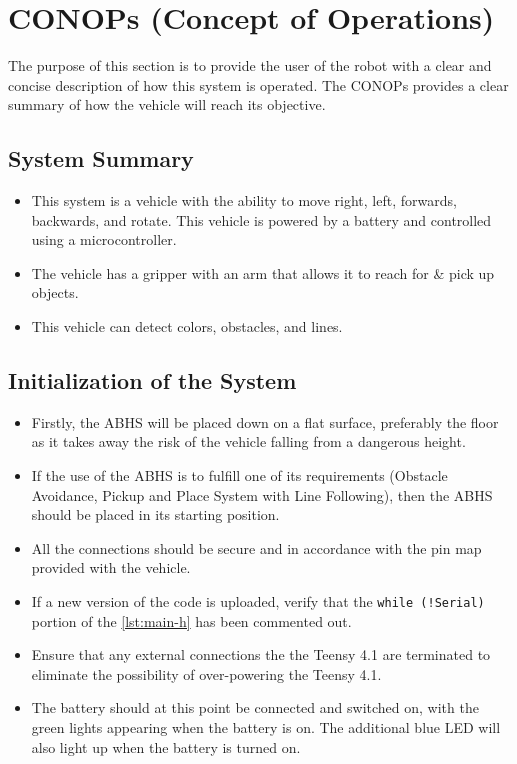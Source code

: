 \documentclass[11pt]{report}
\begin{document}
\chapter{CONOPs (Concept of Operations)}\label{ch:conops}
The purpose of this section is to provide the user of the robot with a clear and concise description of how this system is operated. The \gls{CONOP}s provides a clear summary of how the vehicle will reach its objective. 
\section{System Summary}
\begin{itemize}
    \item This system is a vehicle with the ability to move right, left, forwards, backwards, and rotate. This vehicle is powered by a battery and controlled using a microcontroller.
    \item The vehicle has a gripper with an arm that allows it to reach for \& pick up objects. 
    \item This vehicle can detect colors, obstacles, and lines.
\end{itemize}
\section{Initialization of the System}
\begin{itemize}
    \item Firstly, the \gls{ABHS} will be placed down on a flat surface, preferably the floor as it takes away the risk of the vehicle falling from a dangerous height.
    \item If the use of the \gls{ABHS} is to fulfill one of its requirements (Obstacle Avoidance, Pickup and Place System with Line Following), then the \gls{ABHS} should be placed in its starting position.
    \item All the connections should be secure and in accordance with the pin map provided with the vehicle.
    \item If a new version of the code is uploaded, verify that the \texttt{while (!Serial)} portion of the \cref{lst:main-h} has been commented out.
    \item Ensure that any external connections the the Teensy 4.1 are terminated to eliminate the possibility of over-powering the Teensy 4.1.
    \item The battery should at this point be connected and switched on, with the green lights appearing when the battery is on. The additional blue \gls{LED} will also light up when the battery is turned on.
\end{itemize}
\end{document}
